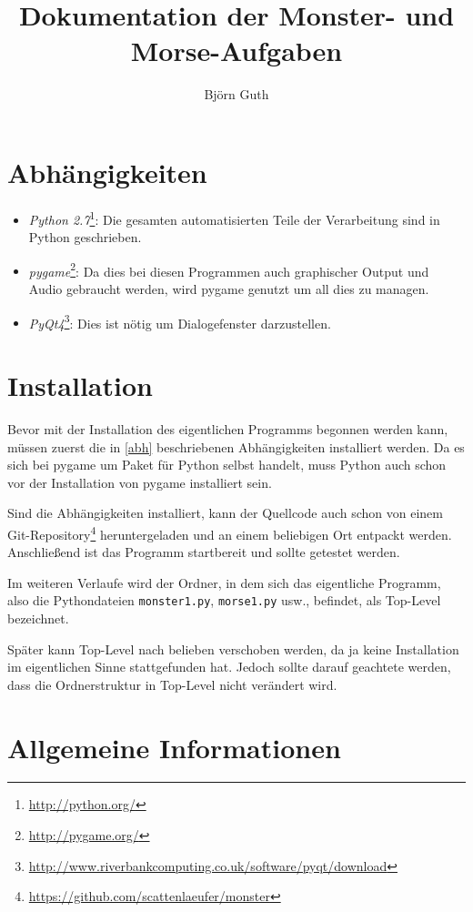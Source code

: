 \documentclass[a4paper]{scrartcl}
\author{Bj\"orn Guth}
\title{Dokumentation der Monster- und Morse-Aufgaben}
\newtheorem[M]{thmL}{Definition}
\begin{document}
\maketitle

\section{Abhängigkeiten}
\label{abh}
\begin{itemize}
	\item \emph{Python 2.7}\footnote{\url{http://python.org/}}: Die gesamten automatisierten Teile der Verarbeitung sind in Python geschrieben.
	\item \emph{pygame}\footnote{\url{http://pygame.org/}}: Da dies bei diesen Programmen auch graphischer Output und Audio gebraucht werden, wird pygame genutzt um all dies zu managen.
	\item \emph{PyQt4}\footnote{\url{http://www.riverbankcomputing.co.uk/software/pyqt/download}}: Dies ist nötig um Dialogefenster darzustellen.
\end{itemize}

\section{Installation}
Bevor mit der Installation des eigentlichen Programms begonnen werden kann, müssen zuerst die in \autoref{abh} beschriebenen Abhängigkeiten installiert werden. Da es sich bei pygame um Paket für Python selbst handelt, muss Python auch schon vor der Installation von pygame installiert sein.

Sind die Abhängigkeiten installiert, kann der Quellcode auch schon von einem Git-Repository\footnote{\url{https://github.com/scattenlaeufer/monster}} heruntergeladen und an einem beliebigen Ort entpackt werden. Anschließend ist das Programm startbereit und sollte getestet werden.
\begin{thmL}
	Im weiteren Verlaufe wird der Ordner, in dem sich das eigentliche Programm, also die Pythondateien \verb+monster1.py+, \verb+morse1.py+ usw., befindet, als Top-Level bezeichnet.
\end{thmL}
Später kann Top-Level nach belieben verschoben werden, da ja keine Installation im eigentlichen Sinne stattgefunden hat. Jedoch sollte darauf geachtete werden, dass die Ordnerstruktur in Top-Level nicht verändert wird.

\section{Allgemeine Informationen}
\end{document}

